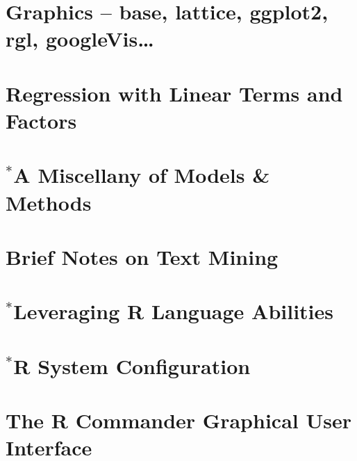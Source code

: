 \documentclass{tufte-book}\usepackage[]{graphicx}\usepackage[]{color}
\begin{document}
\chapter{Graphics -- base, lattice, ggplot2, rgl, googleVis\ldots}\label{ch:plots}



\chapter{Regression with Linear Terms and Factors}


\chapter[A Miscellany of Models \& Methods]{$^*$A Miscellany of Models \& Methods}


% 

\chapter{Brief Notes on Text Mining}\label{ch:tm}


\chapter{$^*$Leveraging R Language Abilities }


\appendix

\chapter{$^*$R System Configuration}\label{ch:sys}


\chapter{The R Commander Graphical User Interface}

\end{document}
